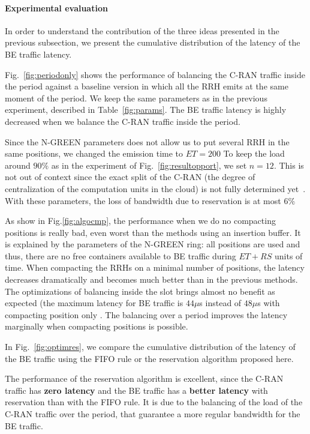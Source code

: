 \documentclass[10pt, conference, letterpaper]{IEEEtran}
\begin{document}
  \paragraph{Experimental evaluation}

  In order to understand the contribution of the three ideas presented in the previous subsection,
   we present the cumulative distribution of the latency of the BE traffic latency.
   
Fig.~\ref{fig:periodonly} shows the performance of balancing the C-RAN traffic inside the period against a baseline version in which all the RRH emits at the same moment of the period. We keep the same parameters as in the previous experiment, described in Table~\ref{fig:params}. The BE traffic latency is highly decreased when we balance the C-RAN traffic inside the period.

 Since the N-GREEN parameters does not allow us to put several RRH in the same positions, we changed the emission time to $ET = 200$ To keep the load around $90\%$ as in the experiment of Fig.~\ref{fig:resultopport}, we set $n = 12$. This is not out of context since the exact split of the C-RAN (the degree of centralization of the computation units in the cloud) is not fully determined yet~\cite{mobile2011c}. With these parameters, the loss of bandwidth due to reservation is at most $6\%$

As show in Fig.\ref{fig:algocmp}, the performance when we do no compacting positions is really bad, even worst than the methods using an insertion buffer. It is explained by the parameters of the N-GREEN ring: all positions are used and thus, there are no free containers available to BE traffic during $ET+RS$ units of time. When compacting the RRHs on a minimal number of positions, the latency decreases dramatically and becomes much better than in the previous methods. The optimizations of balancing inside the slot brings almost no benefit as expected (the maximum latency for BE traffic is $44\mu$s instead of $48\mu$s with compacting position only . The balancing over a period improves the latency marginally when compacting positions is possible. 

In Fig.~\ref{fig:optimres}, we compare the cumulative distribution of the latency of the BE traffic using the FIFO rule or the reservation algorithm proposed here.

  The performance of the reservation algorithm is excellent, since the C-RAN traffic has {\bf zero latency} and the BE traffic has a \textbf{better latency} with reservation than with the FIFO rule. It is due to the balancing of the load of the C-RAN traffic over the period, that guarantee a more regular bandwidth for the BE traffic.
  
\end{document}
